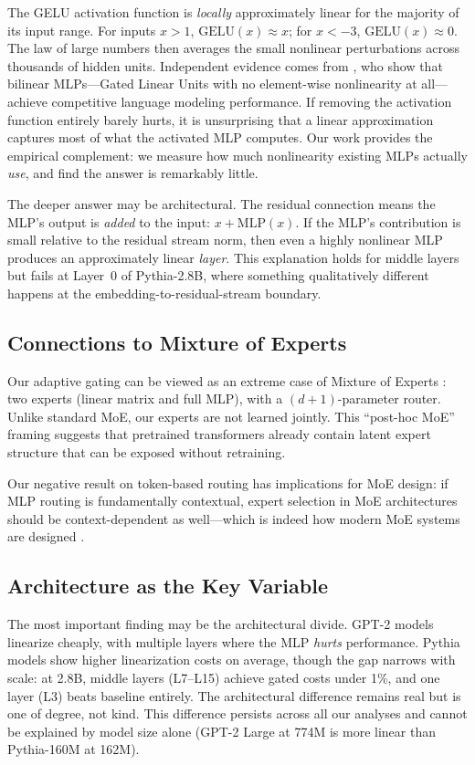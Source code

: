 \documentclass[11pt]{article}
\begin{document}
The GELU activation function is \textit{locally} approximately linear for the majority of its input range. For inputs $x > 1$, $\mathrm{GELU}(x) \approx x$; for $x < -3$, $\mathrm{GELU}(x) \approx 0$. The law of large numbers then averages the small nonlinear perturbations across thousands of hidden units. Independent evidence comes from \citet{dooms2025}, who show that bilinear MLPs---Gated Linear Units with no element-wise nonlinearity at all---achieve competitive language modeling performance. If removing the activation function entirely barely hurts, it is unsurprising that a linear approximation captures most of what the activated MLP computes. Our work provides the empirical complement: we measure how much nonlinearity existing MLPs actually \textit{use}, and find the answer is remarkably little.

The deeper answer may be architectural. The residual connection means the MLP's output is \textit{added} to the input: $x + \mathrm{MLP}(x)$. If the MLP's contribution is small relative to the residual stream norm, then even a highly nonlinear MLP produces an approximately linear \textit{layer}. This explanation holds for middle layers but fails at Layer~0 of Pythia-2.8B, where something qualitatively different happens at the embedding-to-residual-stream boundary.

\subsection{Connections to Mixture of Experts}

Our adaptive gating can be viewed as an extreme case of Mixture of Experts \citep{shazeer2017}: two experts (linear matrix and full MLP), with a $(d{+}1)$-parameter router. Unlike standard MoE, our experts are not learned jointly. This ``post-hoc MoE'' framing suggests that pretrained transformers already contain latent expert structure that can be exposed without retraining.

Our negative result on token-based routing has implications for MoE design: if MLP routing is fundamentally contextual, expert selection in MoE architectures should be context-dependent as well---which is indeed how modern MoE systems are designed \citep{shazeer2017}.

\subsection{Architecture as the Key Variable}

The most important finding may be the architectural divide. GPT-2 models linearize cheaply, with multiple layers where the MLP \textit{hurts} performance. Pythia models show higher linearization costs on average, though the gap narrows with scale: at 2.8B, middle layers (L7--L15) achieve gated costs under 1\%, and one layer (L3) beats baseline entirely. The architectural difference remains real but is one of degree, not kind. This difference persists across all our analyses and cannot be explained by model size alone (GPT-2 Large at 774M is more linear than Pythia-160M at 162M).
\end{document}
